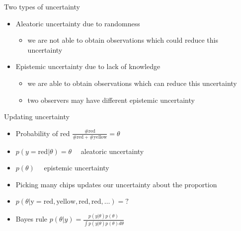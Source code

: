\documentclass[10pt,handout]{beamer}
\begin{document}
\begin{frame}{Two types of uncertainty}

  \begin{itemize}
  \item Aleatoric uncertainty due to randomness
    \begin{itemize}
    \item<2-> we are not able to obtain observations which could reduce
      this uncertainty
    \end{itemize}
    \vspace{\baselineskip}
  \item Epistemic uncertainty due to lack of knowledge
    \begin{itemize}
    \item<3-> we are able to obtain observations which can reduce
      this uncertainty
    \item<3-> two observers may have different epistemic uncertainty
    \end{itemize}
  \end{itemize}
\end{frame}


\begin{frame}{Updating uncertainty}

  \begin{itemize}
  \item<2-> Probability of red $\frac{\mathrm{\#red}}{\mathrm{\#red+\#yellow}}=\theta$
    \vspace{\baselineskip}
  \item<3-> $p(y=\mathrm{red}|\theta)=\theta \quad$ aleatoric uncertainty
    \vspace{\baselineskip}
  \item<4-> $p(\theta) \quad$ epistemic uncertainty
    \vspace{\baselineskip}
  \item<5-> Picking many chips updates our uncertainty about the proportion
    \vspace{\baselineskip}
  \item<5-> $p(\theta|\mathrm{y=red,yellow,red,red,\ldots})=?$
    \vspace{\baselineskip}
  \item<6-> Bayes rule
      $p(\theta|y)=\frac{p(y|\theta)p(\theta)}{\int p(y|\theta)p(\theta) d\theta}$
  \end{itemize}
\end{frame}
\end{document}
